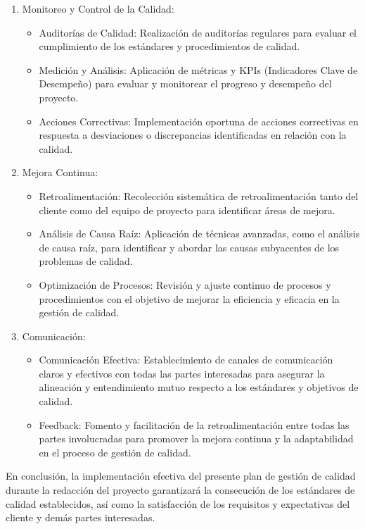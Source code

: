 \documentclass[../main.tex]{subfiles}
\begin{document}
\begin{enumerate}
    \item Monitoreo y Control de la Calidad:
    \begin{itemize}
        \item Auditorías de Calidad: Realización de auditorías regulares para evaluar el cumplimiento de los estándares y procedimientos de calidad.
        \item Medición y Análisis: Aplicación de métricas y KPIs (Indicadores Clave de Desempeño) para evaluar y monitorear el progreso y desempeño del proyecto.
        \item Acciones Correctivas: Implementación oportuna de acciones correctivas en respuesta a desviaciones o discrepancias identificadas en relación con la calidad.
    \end{itemize}
    \item Mejora Continua:
    \begin{itemize}
        \item Retroalimentación: Recolección sistemática de retroalimentación tanto del cliente como del equipo de proyecto para identificar áreas de mejora.
        \item Análisis de Causa Raíz: Aplicación de técnicas avanzadas, como el análisis de causa raíz, para identificar y abordar las causas subyacentes de los problemas de calidad.
        \item Optimización de Procesos: Revisión y ajuste continuo de procesos y procedimientos con el objetivo de mejorar la eficiencia y eficacia en la gestión de calidad.
    \end{itemize}
    \item Comunicación:
    \begin{itemize}
        \item Comunicación Efectiva: Establecimiento de canales de comunicación claros y efectivos con todas las partes interesadas para asegurar la alineación y entendimiento mutuo respecto a los estándares y objetivos de calidad.
        \item Feedback: Fomento y facilitación de la retroalimentación entre todas las partes involucradas para promover la mejora continua y la adaptabilidad en el proceso de gestión de calidad.
    \end{itemize}
\end{enumerate}
En conclusión, la implementación efectiva del presente plan de gestión de calidad durante la redacción del proyecto garantizará la consecución de los estándares de calidad establecidos, así como la satisfacción de los requisitos y expectativas del cliente y demás partes interesadas.
\end{document}
